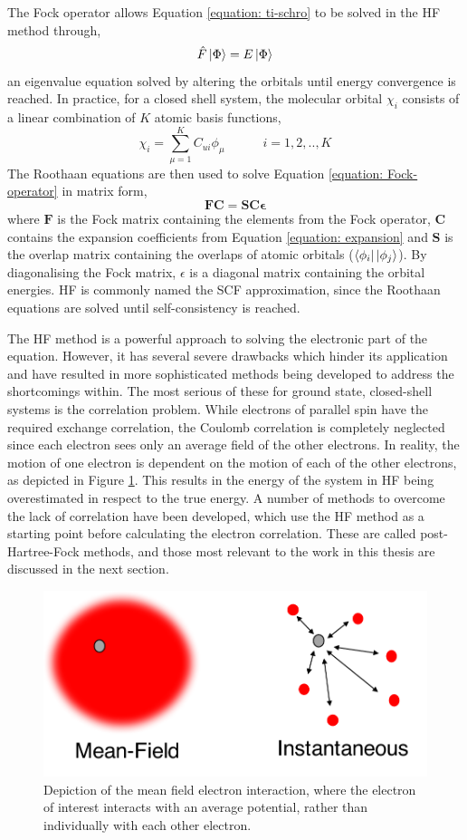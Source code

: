 The Fock operator allows Equation \ref{equation: ti-schro} to be solved in the \ac{HF} method through,
\begin{equation}\label{equation: Fock-operator}
    \hat{F}\ket{\Phi}=E\ket{\Phi}
\end{equation}
an eigenvalue equation solved by altering the orbitals until energy convergence is reached. In practice, for a closed shell system, the molecular orbital $\chi_{i}$ consists of a linear combination of $K$ atomic basis functions,
\begin{equation}\label{equation: expansion}
    \chi_{i}=\sum_{\mu=1}^{K}C_{ui}\phi_{\mu}\qquad\quad{}i=1,2,..,K
\end{equation}
The Roothaan equations are then used to solve Equation \ref{equation: Fock-operator} in matrix form,
\begin{equation}
    \bm{FC}={\bm{SC\epsilon}}
\end{equation}
where $\bm{F}$ is the Fock matrix containing the elements from the Fock operator, $\bm{C}$ contains the expansion coefficients from Equation \ref{equation: expansion} and $\bm{S}$ is the overlap matrix containing the overlaps of atomic orbitals ($\bra{\phi_{i}}\ket{\phi_{j}}$). By diagonalising the Fock matrix, $\epsilon$ is a diagonal matrix containing the orbital energies. \ac{HF} is commonly named the \ac{SCF} approximation, since the Roothaan equations are solved until self-consistency is reached.


The \ac{HF} method is a powerful approach to solving the electronic part of the \schro{} equation. However, it has several severe drawbacks which hinder its application and have resulted in more sophisticated methods being developed to address the shortcomings within. The most serious of these for ground state, closed-shell systems is the correlation problem. While electrons of parallel spin have the required exchange correlation, the Coulomb correlation is completely neglected since each electron sees only an average field of the other electrons. In reality, the motion of one electron is dependent on the motion of each of the other electrons, as depicted in Figure \ref{figure: mean-field}. This results in the energy of the system in \ac{HF} being overestimated in respect to the true energy. A number of methods to overcome the lack of correlation have been developed, which use the \ac{HF} method as a starting point before calculating the electron correlation. These are called post-Hartree-Fock methods, and those most relevant to the work in this thesis are discussed in the next section.
\begin{figure}[t]
\centering
  \includegraphics[width=0.4\linewidth]{2Theory/Mean_Field.pdf}
  \caption[Schematic of the mean-field approximation]{Depiction of the mean field electron interaction, where the electron of interest interacts with an average potential, rather than individually with each other electron.}
  \label{figure: mean-field}
\end{figure}

